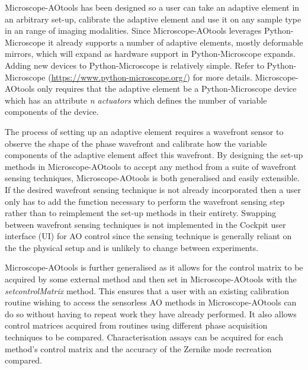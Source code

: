 Microscope-AOtools has been designed so a user can take an adaptive element 
in an arbitrary set-up, calibrate the adaptive element and use it on any 
sample type in an range of imaging modalities. Since Microscope-AOtools 
leverages Python-Microscope it already supports a number of adaptive 
elements, mostly deformable mirrors, which will expand as hardware support 
in Python-Microscope expands. Adding new devices to Python-Microscope is 
relatively simple. Refer to Python-Microscope 
(\url{https://www.python-microscope.org/}) for more details. 
Microscope-AOtools only requires that the adaptive element be a 
Python-Microscope device which has an attribute \textit{n\textunderscore 
actuators} which defines the number of variable components of the device.

The process of setting up an adaptive element requires a wavefront sensor 
to observe the shape of the phase wavefront and calibrate how the variable 
components of the adaptive element affect this wavefront. By designing the 
set-up methods in Microscope-AOtools to accept any method from a suite of 
wavefront sensing techniques, Microscope-AOtools is both generalised and 
easily extensible. If the desired wavefront sensing technique is not 
already incorporated then a user only has to add the function necessary to 
perform the wavefront sensing step rather than to reimplement the set-up 
methods in their entirety. Swapping between wavefront sensing techniques is 
not implemented in the Cockpit user interface (UI) for AO control since the 
sensing technique is generally reliant on the the physical setup and is 
unlikely to change between experiments.

Microscope-AOtools is further generalised as it allows for the control 
matrix to be acquired by some external method and then set in 
Microscope-AOtools with the \textit{set\textunderscore controlMatrix} 
method. This ensures that a user with an existing calibration routine 
wishing to access the sensorless AO methods in Microscope-AOtools can do so 
without having to repeat work they have already performed. It also allows 
control matrices acquired from routines using different phase acquisition 
techniques to be compared. Characterisation assays can be acquired for each 
method's control matrix and the accuracy of the Zernike mode recreation 
compared.

